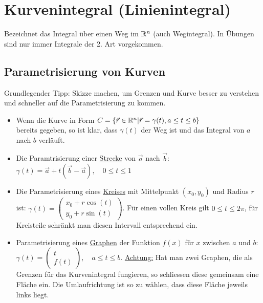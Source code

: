 \section{Kurvenintegral (Linienintegral)}
Bezeichnet das Integral über einen Weg im $\mathbb{R}^n$ (auch Wegintegral). 
In Übungen sind nur immer Integrale der 2. Art vorgekommen. 

\subsection{Parametrisierung von Kurven}
Grundlegender Tipp: Skizze machen, um Grenzen und Kurve besser zu verstehen und
schneller auf die Parametrisierung zu kommen.

\begin{itemize}[leftmargin=*]
	\item Wenn die Kurve in Form
	$
	C = \{\vec{r} \in \mathbb{R}^n | \vec{r} = \gamma(t), a \leq t \leq b\}
	$\\
	bereits gegeben, so ist klar, dass $\gamma(t)$ der Weg ist und das Integral von
	$a$ nach $b$ verläuft.
	
	\item Die Paramtrisierung einer \underline{Strecke} von $\vec{a}$ nach $\vec{b}$:\\
	$\gamma(t) = \vec{a} + t(\vec{b}-\vec{a}), \quad 0 \leq t \leq 1$
	
	\item Die Parametrisierung eines \underline{Kreises} mit Mittelpunkt $(x_0, y_0)$ und
	Radius $r$ ist: $\gamma(t) =
	\begin{pmatrix}
	x_0 + r \cos(t)\\
	y_0 + r \sin(t)
	\end{pmatrix}$. Für einen vollen Kreis gilt $0 \leq t \leq 2\pi$, für Kreisteile
	schränkt man diesen Intervall entsprechend ein.
	
	\item Parametrisierung eines \underline{Graphen} der Funktion $f(x)$ für $x$
	zwischen $a$ und $b$: $\gamma(t) =
	\begin{pmatrix}
	t\\
	f(t)
	\end{pmatrix}, \quad a \leq t \leq b$. \underline{Achtung:} Hat man zwei
	Graphen, die als Grenzen für das Kurvenintegral fungieren, so schliessen diese
	gemeinsam eine Fläche ein. Die Umlaufrichtung ist so zu wählen, dass diese
	Fläche jeweils links liegt.
\end{itemize}


